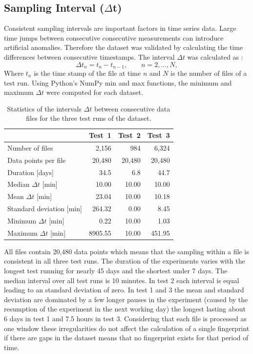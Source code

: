 \subsection{Sampling Interval ($\Delta$t)}
Consistent sampling intervals are important factors in time series data. Large time jumps between consecutive consecutive measurements can introduce artificial anomalies. Therefore the dataset was validated by calculating the time differences between consecutive timestamps. 
The interval $\Delta t$ was calculated as : \\
\begin{equation}
    \Delta t_n = t_n - t_{n-1}, \qquad n = 2, \dots, N,
\end{equation}
Where $t_n$ is the time stamp of the file at time $n$ and $N$ is the number of files of a test run.
Using Python's NumPy min and max functions, the minimum and maximum $\Delta t$ were computed for each dataset. 
\begin{table}[H]
    \centering
    \begin{tabular}{|l|r|r|r|}
        \hline
        & Test~1 & Test~2 & Test~3 \\
        \hline
        Number of files                 & 2,156   & 984    & 6,324  \\
        Data points per file            & 20,480  & 20,480 & 20,480 \\
        Duration [days]                 & 34.5    & 6.8    & 44.7   \\
        Median $\Delta t$ [min]         & 10.00   & 10.00  & 10.00  \\
        Mean $\Delta t$ [min]           & 23.04   & 10.00  & 10.18  \\
        Standard deviation [min]        & 264.32  & 0.00   & 8.45   \\
        Minimum $\Delta t$ [min]        & 0.22    & 10.00  & 1.03   \\
        Maximum $\Delta t$ [min]        & 8905.55 & 10.00  & 451.95 \\
        \hline
    \end{tabular}
    \caption{Statistics of the intervals $\Delta t$ between consecutive data files for the
    three test runs of the dataset.}
    \label{tab:samplingIntervals}
\end{table}
All files contain 20,480 data points which means that the sampling within a file is consistent in all three test runs. The duration of the experiments varies with the longest test running for nearly 45 days and the shortest under 7 days. The median interval over all test runs is 10 minutes. In test 2 each interval is equal leading to an standard deviation of zero. In test 1 and 3 the mean and standard deviation are dominated by a few longer pauses in the experiment (caused by the resumption of the experiment in the next working day) the longest lasting about 6 days in test 1 and 7.5 hours in test 3. 
Considering that each file is processed as one window these irregularities do not affect the calculation of a single fingerprint if there are gaps in the dataset means that no fingerprint exists for that period of time.